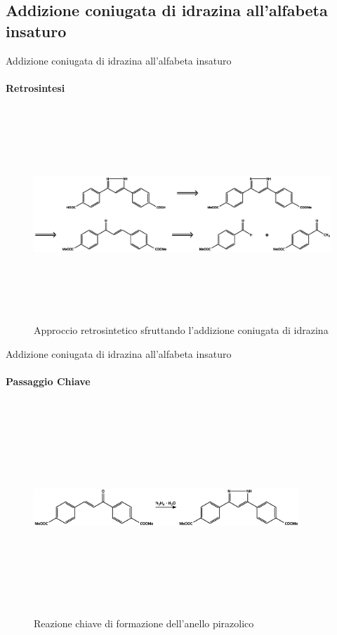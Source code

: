 \documentclass{beamer}
\begin{document}
\subsection{Addizione coniugata di idrazina all'alfabeta insaturo}

\begin{frame}{Addizione coniugata di idrazina all'alfabeta insaturo}
	\framesubtitle{Retrosintesi}
	\begin{figure}[h!]
		\centering
		\includegraphics[width=13cm,height=8cm,keepaspectratio]{../Structures/pyrazole-retro-alt.eps}
		\caption{Approccio retrosintetico sfruttando l'addizione coniugata di idrazina}
	\end{figure}
\end{frame}

\begin{frame}{Addizione coniugata di idrazina all'alfabeta insaturo}
	\framesubtitle{Passaggio Chiave}
	\begin{figure}[h]
		\centering
		\includegraphics[width=10cm,height=8cm,keepaspectratio]{../Structures/pyrazole-form-alt.eps}
		\caption{Reazione chiave di formazione dell'anello pirazolico}
	\end{figure}
\end{frame}
\end{document}
